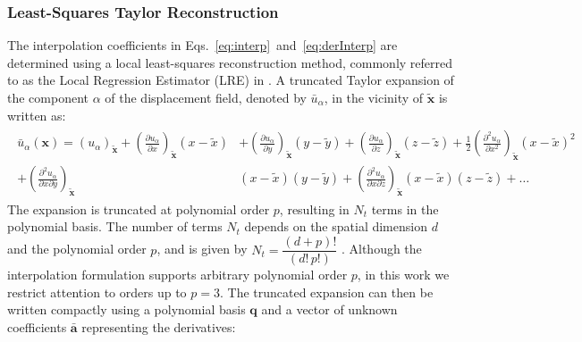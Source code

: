 \documentclass[sn-mathphys,Numbered]{sn-jnl}%
\newcommand{\bb}{\boldsymbol}
\begin{document}
\subsubsection{Least-Squares Taylor Reconstruction}
%
The interpolation coefficients in Eqs.~\eqref{eq:interp}~and~\eqref{eq:derInterp} are determined using a local least-squares reconstruction method, commonly referred to as the Local Regression Estimator (LRE) in \cite{Castrillo2022, Castrillo2023, Castrillo2024}. A truncated Taylor expansion of the component $\alpha$ of the displacement field, denoted by $\bar{u}_\alpha$, in the vicinity of $\tilde{\boldsymbol{x}}$ is written as:
%
\begin{eqnarray}
\begin{split}
\bar{u}_\alpha(\bb{x}) =
(u_\alpha)_{\tilde{\bb{x}}}
 + \left(\frac{\partial u_\alpha}{\partial x}\right)_{\tilde{\bb{x}}}(x-\tilde{x})&
 + \left(\frac{\partial u_\alpha}{\partial y}\right)_{\tilde{\bb{x}}}(y-\tilde{y})
 + \left(\frac{\partial u_\alpha}{\partial z}\right)_{\tilde{\bb{x}}}(z-\tilde{z})
 + \frac{1}{2}\left(\frac{\partial^2 u_\alpha}{\partial x^2}\right)_{\tilde{\bb{x}}}(x-\tilde{x})^2 \\
 +  \left(\frac{\partial^2 u_\alpha}{\partial x \partial y}\right)_{\tilde{\bb{x}}}&(x-\tilde{x})(y-\tilde{y})
 +  \left(\frac{\partial^2 u_\alpha}{\partial x \partial z}\right)_{\tilde{\bb{x}}}(x-\tilde{x})(z-\tilde{z})
 + \dots
\end{split}
\label{eq:te}
\end{eqnarray}
%
The expansion is truncated at polynomial order $p$, resulting in $N_t$ terms in the polynomial basis.
The number of terms $N_t$ depends on the spatial dimension $d$ and the polynomial order $p$, and is given by
 $N_t = \dfrac{(d+p)!}{(d!\,p!)}$ \cite{Khelladi2011}.
Although the interpolation formulation supports arbitrary polynomial order $p$, in this work we restrict attention to orders up to $p = 3$.
The truncated expansion can then be written compactly using a polynomial basis $\mathbf{q}$ and a vector of unknown coefficients $\bar{\mathbf{a}}$ representing the derivatives:
%
\end{document}
